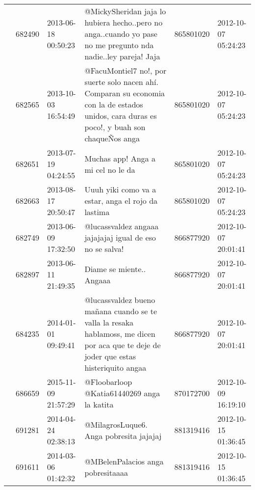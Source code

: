 \begin{tabular}{llllrl}
           & 682490  & 2013-06-18 00:50:23 &                                @MickySheridan jaja lo hubiera hecho..pero no anga..cuando yo pase no me pregunto nda nadie..ley pareja! Jaja &   865801020 & 2012-10-07 05:24:23 \\
           & 682565  & 2013-10-03 16:54:49 &  @FacuMontiel7 no!, por suerte solo nacen ahí. Comparan su economia con la de estados unidos, cara duras es poco!, y buah son chaqueÑos anga &   865801020 & 2012-10-07 05:24:23 \\
           & 682651  & 2013-07-19 04:24:55 &                                                                                                           Muchas app! Anga a mi cel no le da &   865801020 & 2012-10-07 05:24:23 \\
           & 682663  & 2013-08-17 20:50:47 &                                                                                           Uuuh yiki como va a estar, anga el rojo da lastima &   865801020 & 2012-10-07 05:24:23 \\
           & 682749  & 2013-06-09 17:32:50 &                                                                                     @lucassvaldez angaaa jajajajaj igual de eso no se salva! &   866877920 & 2012-10-07 20:01:41 \\
           & 682897  & 2013-06-11 21:49:35 &                                                                                                                     Diame se miente.. Angaaa &   866877920 & 2012-10-07 20:01:41 \\
           & 684235  & 2014-01-01 09:49:41 &        @lucassvaldez bueno mañana cuando se te valla la resaka hablamoss, me dicen por aca que te deje de joder que estas histeriquito angaa &   866877920 & 2012-10-07 20:01:41 \\
           & 686659  & 2015-11-09 21:57:29 &                                                                                                   @Floobarloop @Katia61440269 anga la katita &   870172700 & 2012-10-09 16:19:10 \\
           & 691281  & 2014-04-24 02:38:13 &                                                                                                      @MilagrosLuque6. Anga pobresita jajajaj &   881319416 & 2012-10-15 01:36:45 \\
           & 691611  & 2014-03-06 01:42:32 &                                                                                                            @MBelenPalacios anga pobresitaaaa &   881319416 & 2012-10-15 01:36:45 \\

\end{tabular}
